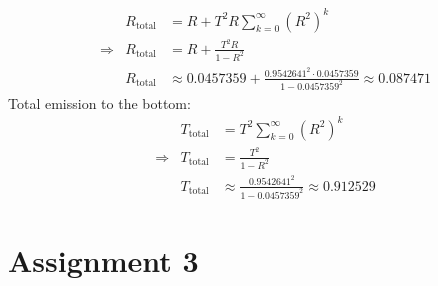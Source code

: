 \documentclass{article}
\begin{document}
    \begin{align*}
        &&               R_{\text{total}} &= R + T^2 R \sum_{k=0}^{\infty} (R^2)^k\\
        &\Rightarrow&    R_{\text{total}} &= R + \frac{T^2 R}{1 - R^2}\\
        &&               R_{\text{total}} &\approx 0.0457359 + \frac{0.9542641^2 \cdot 0.0457359}{1 - 0.0457359^2} \approx 0.087471
    \end{align*}
    Total emission to the bottom:\\
    \begin{align*}
        &&               T_{\text{total}} &= T^2 \sum_{k=0}^{\infty} (R^2)^k\\
        &\Rightarrow&    T_{\text{total}} &= \frac{T^2}{1 - R^2}\\
        &&               T_{\text{total}} &\approx \frac{0.9542641^2}{1 - 0.0457359^2} \approx 0.912529
    \end{align*}
    
    \section*{Assignment 3}

    
\end{document}

